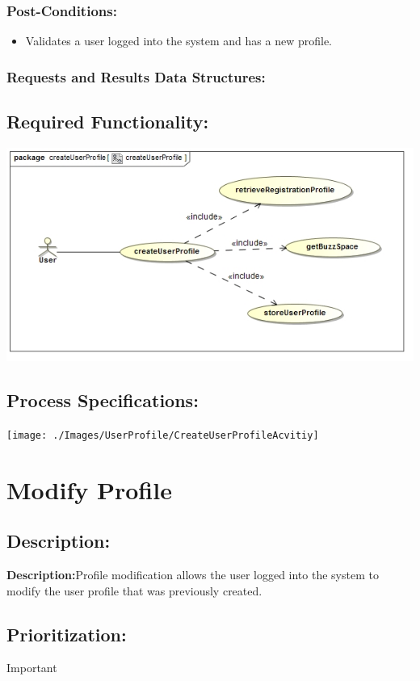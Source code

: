 \documentclass[a4paper,11pt]{article}
\begin{document}
\subsubsection*{Post-Conditions:}
\begin{itemize}
\item Validates a user logged into the system and has a new profile.
\end{itemize}
\subsubsection*{Requests and Results Data Structures:}
\subsection{Required Functionality:} 
\includegraphics[width=1\linewidth]{./Images/UserProfile/CreateUserProfileUseCase}
\subsection{Process Specifications:} 
\texttt{[image: ./Images/UserProfile/CreateUserProfileAcvitiy]}

\section{Modify Profile}
\subsection*{Description:}
\textbf{Description:}Profile modification allows the user logged into the system to modify the user profile that was previously created.
\subsection{Prioritization:}
\textbf{}Important
\end{document}
